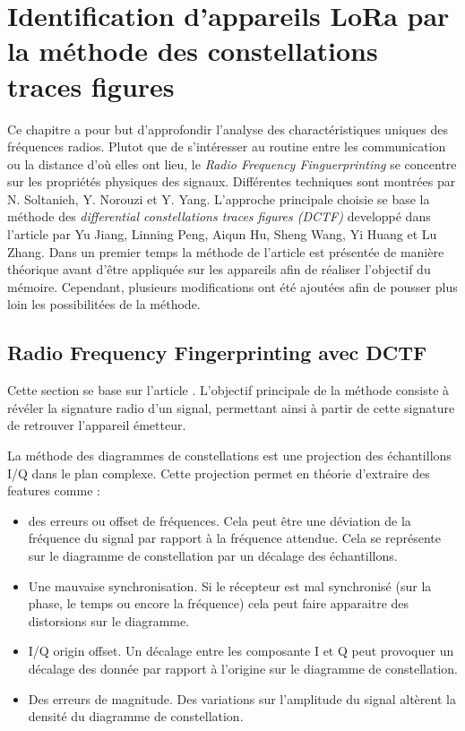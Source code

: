 \chapter{Identification d'appareils LoRa par la méthode des constellations traces figures}

Ce chapitre a pour but d'approfondir l'analyse des charactéristiques uniques des fréquences radios. Plutot que de s'intéresser au routine entre les communication ou la distance d'où elles ont lieu, le \textit{Radio Frequency Finguerprinting} se concentre sur les propriétés physiques des signaux. Différentes techniques sont montrées par N. Soltanieh, Y. Norouzi et Y. Yang\cite{rffi1}. L'approche principale choisie se base la méthode des \textit{differential constellations traces figures (DCTF)} developpé dans l'article \cite{loraDCTF} par Yu Jiang, Linning Peng, Aiqun Hu, Sheng Wang, Yi Huang et Lu Zhang. Dans un premier temps la méthode de l'article est présentée de manière théorique avant d'être appliquée sur les appareils afin de réaliser l'objectif du mémoire. Cependant, plusieurs modifications ont été ajoutées afin de pousser plus loin les possibilitées de la méthode.

\section{Radio Frequency Fingerprinting avec DCTF}\label{DCTF}

Cette section se base sur l'article \cite{loraDCTF}. L'objectif principale de la méthode consiste à révéler la signature radio d'un signal, permettant ainsi à partir de cette signature de retrouver l'appareil émetteur.

La méthode des diagrammes de constellations est une projection des échantillons I/Q dans le plan complexe. Cette projection permet en théorie d'extraire des features comme :

\begin{itemize}
\item des erreurs ou offset de fréquences. Cela peut être une déviation de la fréquence du signal par rapport à la fréquence attendue. Cela se représente sur le diagramme de constellation par un décalage des échantillons. 
\item Une mauvaise synchronisation. Si le récepteur est mal synchronisé (sur la phase, le temps ou encore la fréquence) cela peut faire apparaitre des distorsions sur le diagramme.
\item I/Q origin offset. Un décalage entre les composante I et Q peut provoquer un décalage des donnée par rapport à l'origine sur le diagramme de constellation.
\item Des erreurs de magnitude. Des variations sur l'amplitude du signal altèrent la densité du diagramme de constellation.
\end{itemize}


